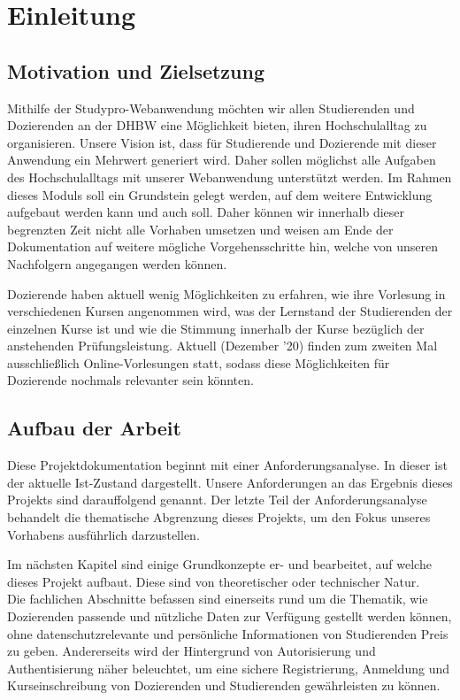 \chapter{Einleitung}
\section{Motivation und Zielsetzung}

Mithilfe der Studypro-Webanwendung möchten wir allen Studierenden und Dozierenden an der DHBW eine Möglichkeit bieten, ihren Hochschulalltag zu organisieren. 
Unsere Vision ist, dass für Studierende und Dozierende mit dieser Anwendung ein Mehrwert generiert wird. Daher sollen möglichst alle Aufgaben des Hochschulalltags mit unserer Webanwendung unterstützt werden. 
Im Rahmen dieses Moduls soll ein Grundstein gelegt werden, auf dem weitere Entwicklung aufgebaut werden kann und auch soll. 
Daher können wir innerhalb dieser begrenzten Zeit nicht alle Vorhaben umsetzen und weisen am Ende der Dokumentation auf weitere mögliche Vorgehensschritte hin, welche von unseren Nachfolgern angegangen werden können.

Dozierende haben aktuell wenig Möglichkeiten zu erfahren, wie ihre Vorlesung in verschiedenen Kursen angenommen wird, was der Lernstand der Studierenden der einzelnen Kurse ist und wie die Stimmung innerhalb der Kurse bezüglich der anstehenden Prüfungsleistung. 
Aktuell (Dezember '20) finden zum zweiten Mal ausschließlich Online-Vorlesungen statt, sodass diese Möglichkeiten für Dozierende nochmals relevanter sein könnten.


\section{Aufbau der Arbeit}

Diese Projektdokumentation beginnt mit einer Anforderungsanalyse. In dieser ist der aktuelle Ist-Zustand dargestellt.
Unsere Anforderungen an das Ergebnis dieses Projekts sind darauffolgend genannt. Der letzte Teil der Anforderungsanalyse behandelt die thematische Abgrenzung dieses Projekts, um den Fokus unseres Vorhabens ausführlich darzustellen.

Im nächsten Kapitel sind einige Grundkonzepte er- und bearbeitet, auf welche dieses Projekt aufbaut. Diese sind von theoretischer oder technischer Natur.\\
Die fachlichen Abschnitte befassen sind einerseits rund um die Thematik, wie Dozierenden passende und nützliche Daten zur Verfügung gestellt werden können, ohne datenschutzrelevante und persönliche Informationen von Studierenden Preis zu geben. 
Andererseits wird der Hintergrund von Autorisierung und Authentisierung näher beleuchtet, um eine sichere Registrierung, Anmeldung und Kurseinschreibung von Dozierenden und Studierenden gewährleisten zu können.

